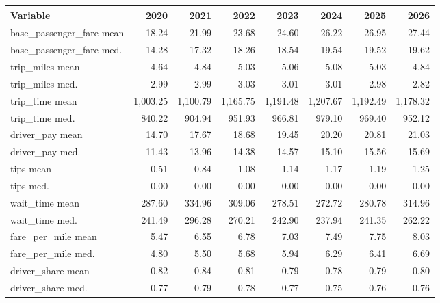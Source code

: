 \begin{tabular}{lrrrrrrr}
\toprule
Variable & 2020 & 2021 & 2022 & 2023 & 2024 & 2025 & 2026 \\
\midrule
base\_passenger\_fare mean & 18.24 & 21.99 & 23.68 & 24.60 & 26.22 & 26.95 & 27.44 \\
base\_passenger\_fare med. & 14.28 & 17.32 & 18.26 & 18.54 & 19.54 & 19.52 & 19.62 \\
trip\_miles mean & 4.64 & 4.84 & 5.03 & 5.06 & 5.08 & 5.03 & 4.84 \\
trip\_miles med. & 2.99 & 2.99 & 3.03 & 3.01 & 3.01 & 2.98 & 2.82 \\
trip\_time mean & 1,003.25 & 1,100.79 & 1,165.75 & 1,191.48 & 1,207.67 & 1,192.49 & 1,178.32 \\
trip\_time med. & 840.22 & 904.94 & 951.93 & 966.81 & 979.10 & 969.40 & 952.12 \\
driver\_pay mean & 14.70 & 17.67 & 18.68 & 19.45 & 20.20 & 20.81 & 21.03 \\
driver\_pay med. & 11.43 & 13.96 & 14.38 & 14.57 & 15.10 & 15.56 & 15.69 \\
tips mean & 0.51 & 0.84 & 1.08 & 1.14 & 1.17 & 1.19 & 1.25 \\
tips med. & 0.00 & 0.00 & 0.00 & 0.00 & 0.00 & 0.00 & 0.00 \\
wait\_time mean & 287.60 & 334.96 & 309.06 & 278.51 & 272.72 & 280.78 & 314.96 \\
wait\_time med. & 241.49 & 296.28 & 270.21 & 242.90 & 237.94 & 241.35 & 262.22 \\
fare\_per\_mile mean & 5.47 & 6.55 & 6.78 & 7.03 & 7.49 & 7.75 & 8.03 \\
fare\_per\_mile med. & 4.80 & 5.50 & 5.68 & 5.94 & 6.29 & 6.41 & 6.69 \\
driver\_share mean & 0.82 & 0.84 & 0.81 & 0.79 & 0.78 & 0.79 & 0.80 \\
driver\_share med. & 0.77 & 0.79 & 0.78 & 0.77 & 0.75 & 0.76 & 0.76 \\
\bottomrule
\end{tabular}
